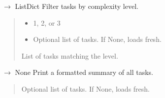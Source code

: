 \documentclass[letterpaper,10pt,english]{sphinxmanual}
\begin{document}

\begin{fulllineitems}
\label{\detokenize{core.utils:core.utils.get_tasks_by_level}}
\pysigstartsignatures
\pysiglinewithargsret
{}
{\sphinxparamcomma {}}
{{ $\rightarrow$ List\DUrole{p}{{[}}Dict\DUrole{p}{{]}}}}
\pysigstopsignatures
\sphinxAtStartPar
Filter tasks by complexity level.
\begin{quote}\begin{description}
\begin{itemize}
\item {} 
\sphinxAtStartPar
{} \textendash{} 1, 2, or 3

\item {} 
\sphinxAtStartPar
{} \textendash{} Optional list of tasks. If None, loads fresh.

\end{itemize}

\sphinxAtStartPar
List of tasks matching the level.

\end{description}\end{quote}

\end{fulllineitems}


\begin{fulllineitems}
\label{\detokenize{core.utils:core.utils.list_task_summary}}
\pysigstartsignatures
\pysiglinewithargsret
{}
{}
{{ $\rightarrow$ None}}
\pysigstopsignatures
\sphinxAtStartPar
Print a formatted summary of all tasks.
\begin{quote}\begin{description}
\sphinxAtStartPar
{} \textendash{} Optional list of tasks. If None, loads fresh.

\end{description}\end{quote}

\end{fulllineitems}
\end{document}
